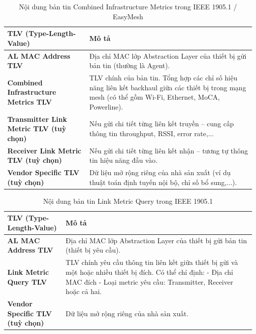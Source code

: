 \begin{table}[ht]
    \centering
    \caption{Nội dung bản tin Combined Infrastructure Metrics trong IEEE 1905.1 / EasyMesh}
    \begin{tabular}{|>{\raggedright\arraybackslash}m{5cm}|>{\raggedright\arraybackslash}m{8cm}|}
    \hline
    \textbf{TLV (Type-Length-Value)} & \textbf{Mô tả} \\
    \hline
    \textbf{AL MAC Address TLV} & Địa chỉ MAC lớp Abstraction Layer của thiết bị gửi bản tin (thường là Agent). \\
    \hline
    \textbf{Combined Infrastructure Metrics TLV} & TLV chính của bản tin. Tổng hợp các chỉ số hiệu năng liên kết backhaul giữa các thiết bị trong mạng mesh (có thể gồm Wi-Fi, Ethernet, MoCA, Powerline). \\
    \hline
    \textbf{Transmitter Link Metric TLV (tuỳ chọn)} & Nếu gửi chi tiết từng liên kết truyền – cung cấp thông tin throughput, RSSI, error rate,... \\
    \hline
    \textbf{Receiver Link Metric TLV (tuỳ chọn)} & Nếu gửi chi tiết từng liên kết nhận – tương tự thông tin hiệu năng đầu vào. \\
    \hline
    \textbf{Vendor Specific TLV (tuỳ chọn)} & Dữ liệu mở rộng riêng của nhà sản xuất (ví dụ thuật toán định tuyến nội bộ, chỉ số bổ sung,...). \\
    \hline
    \end{tabular}
\end{table}

\begin{table}[ht]
\centering
\caption{Nội dung bản tin Link Metric Query trong IEEE 1905.1}
\begin{tabular}{|>{\raggedright\arraybackslash}m{5cm}|>{\raggedright\arraybackslash}m{8cm}|}
\hline
\textbf{TLV (Type-Length-Value)} & \textbf{Mô tả} \\
\hline
\textbf{AL MAC Address TLV} & Địa chỉ MAC lớp Abstraction Layer của thiết bị gửi bản tin (thiết bị yêu cầu). \\
\hline
\textbf{Link Metric Query TLV} & TLV chính yêu cầu thông tin liên kết giữa thiết bị gửi và một hoặc nhiều thiết bị đích. Có thể chỉ định: \newline
- Địa chỉ MAC đích \newline
- Loại metric yêu cầu: Transmitter, Receiver hoặc cả hai. \\
\hline
\textbf{Vendor Specific TLV (tuỳ chọn)} & Dữ liệu mở rộng riêng của nhà sản xuất. \\
\hline
\end{tabular}
\end{table}

